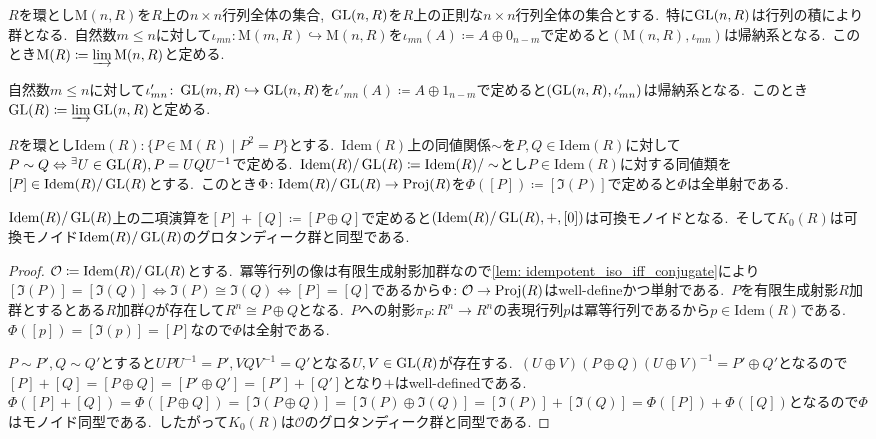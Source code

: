 \begin{definition} \label{def: stableGL}
$R$を環とし$\mathrm{M}(n,R)$を$R$上の$n \times n$行列全体の集合,\ $\operatorname{GL}(n, R)$を$R$上の正則な$n \times n$行列全体の集合とする.\
特に$\operatorname{GL}(n, R)$は行列の積により群となる.\
自然数$m \le n$に対して$\iota_{mn} \colon \mathrm{M}(m, R) \hookrightarrow \mathrm{M}(n, R)$を$\iota_{mn}(A) \coloneq A \oplus 0_{n - m}$で定めると$(\mathrm{M}(n,R), \iota_{mn})$は帰納系となる.\
このとき$\displaystyle \mathrm{M}(R) \coloneq \varinjlim \mathrm{M}(n, R)$と定める.

自然数$m \le n$に対して$\iota'_{mn} \colon \operatorname{GL}(m, R) \hookrightarrow \operatorname{GL}(n, R)$を$\iota'_{mn}(A) \coloneq A \oplus 1_{n - m}$で定めると$(\operatorname{GL}(n,R), \iota'_{mn})$は帰納系となる.\
このとき$\displaystyle \operatorname{GL}(R) \coloneq \varinjlim \operatorname{GL}(n, R)$と定める.
\end{definition}

\begin{theorem} \label{thm: k0_idempotent_orbits}
$R$を環とし$\mathrm{Idem}(R) \colon \{P \in \mathrm{M}(R) \mid P^2 = P\}$とする.\
$\mathrm{Idem}(R)$上の同値関係$\sim$を$P, Q \in \mathrm{Idem}(R)$に対して$P \sim Q \Leftrightarrow {^{\exists}U} \in \operatorname{GL}(R), P = UQU^{-1}$で定める.\
$\mathrm{Idem}(R)/\operatorname{GL}(R) \coloneq \mathrm{Idem}(R)/\sim$とし$P \in \mathrm{Idem}(R)$に対する同値類を$[P] \in \mathrm{Idem}(R)/\operatorname{GL}(R)$とする.\
このとき$\Phi \colon \mathrm{Idem}(R)/\operatorname{GL}(R) \to \operatorname{Proj}(R)$を$\Phi([P]) \coloneq [\Im(P)]$で定めると$\Phi$は全単射である.

$\mathrm{Idem}(R)/\operatorname{GL}(R)$上の二項演算を$[P] + [Q] \coloneq [P \oplus Q]$で定めると$(\mathrm{Idem}(R)/\operatorname{GL}(R), +, [0])$は可換モノイドとなる.\
そして$K_0(R)$は可換モノイド$\mathrm{Idem}(R)/\operatorname{GL}(R)$のグロタンディーク群と同型である.
\end{theorem}
\begin{proof}
$\mathcal{O} \coloneq \mathrm{Idem}(R)/\operatorname{GL}(R)$とする.\
冪等行列の像は有限生成射影加群なので\cref{lem: idempotent_iso_iff_conjugate}により$[\Im(P)] = [\Im(Q)] \iff \Im(P) \cong \Im(Q) \iff [P] = [Q]$であるから$\Phi \colon \mathcal{O} \to \operatorname{Proj}(R)$はwell-defineかつ単射である.\
$P$を有限生成射影$R$加群とするとある$R$加群$Q$が存在して$R^n \cong P \oplus Q$となる.\
$P$への射影$\pi_P \colon R^n \to R^n$の表現行列$p$は冪等行列であるから$p \in \mathrm{Idem}(R)$である.\
$\Phi([p]) = [\Im(p)] = [P]$なので$\Phi$は全射である.

$P \sim P', Q \sim Q'$とすると$UPU^{-1} = P', VQV^{-1} = Q'$となる$U, V \in \operatorname{GL}(R)$が存在する.\
$(U \oplus V)(P \oplus Q)(U \oplus V)^{-1} = P' \oplus Q'$となるので$[P] + [Q] = [P \oplus Q] = [P' \oplus Q'] = [P'] + [Q']$となり$+$はwell-definedである.\
$\Phi([P] + [Q]) = \Phi([P \oplus Q]) = [\Im(P \oplus Q)] = [\Im(P) \oplus \Im(Q)] = [\Im(P)] + [\Im(Q)] = \Phi([P]) + \Phi([Q])$となるので$\Phi$はモノイド同型である.\
したがって$K_0(R)$は$\mathcal{O}$のグロタンディーク群と同型である.
\end{proof}

